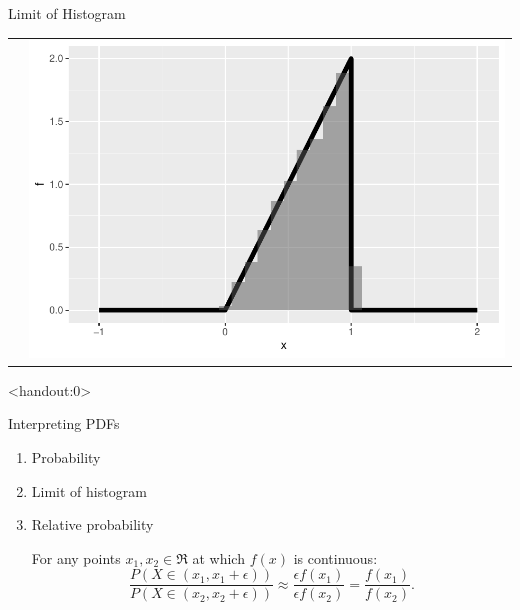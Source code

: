 \begin{frame}
\begin{block}{Limit of Histogram}
\begin{center}
\begin{tabular}{cc}
      & \includegraphics[height=.325\textheight]{figure/example-16-4-4}\\
    \end{tabular}
    \end{center}
  \end{block}
\end{frame}

\begin{frame}<handout:0>
  \begin{block}{Interpreting PDFs}
    \begin{enumerate}
    \item<beamer:0> Probability
      
    \item <beamer:0> Limit of histogram
      
    \item  Relative probability
      
        For any points $x_1,x_2 \in \Re$ at which $f(x)$ is continuous:
        \[
          \frac{P(X \in (x_1,x_1+\epsilon))}{P(X \in (x_2,x_2+\epsilon))}
          \approx
          \frac{\epsilon f(x_1)}{\epsilon f(x_2)}
          =\frac{f(x_1)}{f(x_2)}.
        \]
        
    \end{enumerate}
  \end{block}
\end{frame}



